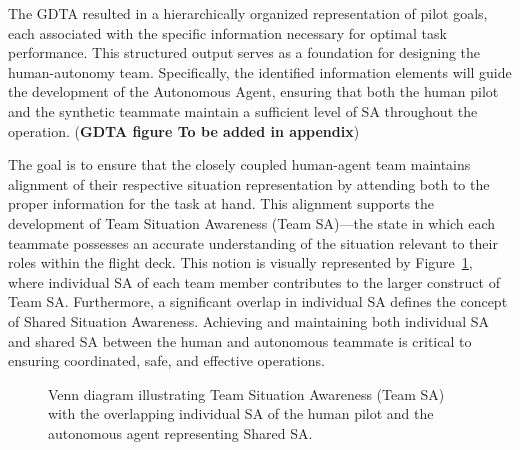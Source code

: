 \documentclass[12pt,a4paper]{article} %
\begin{document}
	The GDTA resulted in a hierarchically organized representation of pilot goals, each associated with the specific information necessary for optimal task performance. This structured output serves as a foundation for designing the human-autonomy team. Specifically, the identified information elements will guide the development of the Autonomous Agent, ensuring that both the human pilot and the synthetic teammate maintain a sufficient level of SA throughout the operation. (\textbf{GDTA figure To be added in appendix})

	The goal is to ensure that the closely coupled human-agent team maintains alignment of their respective situation representation by attending both to the proper information for the task at hand. This alignment supports the development of Team Situation Awareness (Team SA)—the state in which each teammate possesses an accurate understanding of the situation relevant to their roles within the flight deck.
	This notion is visually represented by Figure~\ref{fig:team-sa-venn}, where individual SA of each team member contributes to the larger construct of Team SA. Furthermore, a significant overlap in individual SA defines the concept of Shared Situation Awareness. Achieving and maintaining both individual SA and shared SA between the human and autonomous teammate is critical to ensuring coordinated, safe, and effective operations.

	\begin{figure}[h!]
		\centering
		\caption{Venn diagram illustrating Team Situation Awareness (Team SA) with the overlapping individual SA of the human pilot and the autonomous agent representing Shared SA.}
		\label{fig:team-sa-venn}
	\end{figure}
\end{document}
